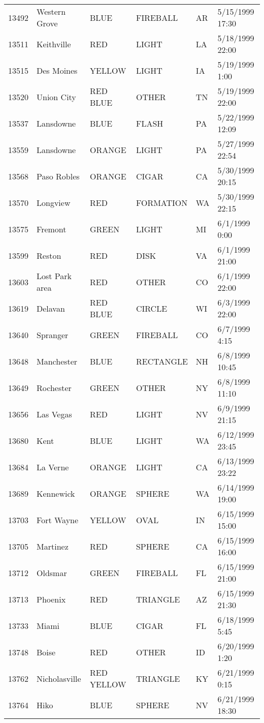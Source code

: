 \begin{tabular}{llllll}
13492 & Western Grove & BLUE & FIREBALL & AR & 5/15/1999 17:30 \\
13511 & Keithville & RED & LIGHT & LA & 5/18/1999 22:00 \\
13515 & Des Moines & YELLOW & LIGHT & IA & 5/19/1999 1:00 \\
13520 & Union City & RED BLUE & OTHER & TN & 5/19/1999 22:00 \\
13537 & Lansdowne & BLUE & FLASH & PA & 5/22/1999 12:09 \\
13559 & Lansdowne & ORANGE & LIGHT & PA & 5/27/1999 22:54 \\
13568 & Paso Robles & ORANGE & CIGAR & CA & 5/30/1999 20:15 \\
13570 & Longview & RED & FORMATION & WA & 5/30/1999 22:15 \\
13575 & Fremont & GREEN & LIGHT & MI & 6/1/1999 0:00 \\
13599 & Reston & RED & DISK & VA & 6/1/1999 21:00 \\
13603 & Lost Park area & RED & OTHER & CO & 6/1/1999 22:00 \\
13619 & Delavan & RED BLUE & CIRCLE & WI & 6/3/1999 22:00 \\
13640 & Spranger & GREEN & FIREBALL & CO & 6/7/1999 4:15 \\
13648 & Manchester & BLUE & RECTANGLE & NH & 6/8/1999 10:45 \\
13649 & Rochester & GREEN & OTHER & NY & 6/8/1999 11:10 \\
13656 & Las Vegas & RED & LIGHT & NV & 6/9/1999 21:15 \\
13680 & Kent & BLUE & LIGHT & WA & 6/12/1999 23:45 \\
13684 & La Verne & ORANGE & LIGHT & CA & 6/13/1999 23:22 \\
13689 & Kennewick & ORANGE & SPHERE & WA & 6/14/1999 19:00 \\
13703 & Fort Wayne & YELLOW & OVAL & IN & 6/15/1999 15:00 \\
13705 & Martinez & RED & SPHERE & CA & 6/15/1999 16:00 \\
13712 & Oldsmar & GREEN & FIREBALL & FL & 6/15/1999 21:00 \\
13713 & Phoenix & RED & TRIANGLE & AZ & 6/15/1999 21:30 \\
13733 & Miami & BLUE & CIGAR & FL & 6/18/1999 5:45 \\
13748 & Boise & RED & OTHER & ID & 6/20/1999 1:20 \\
13762 & Nicholasville & RED YELLOW & TRIANGLE & KY & 6/21/1999 0:15 \\
13764 & Hiko & BLUE & SPHERE & NV & 6/21/1999 18:30 \\

\end{tabular}
